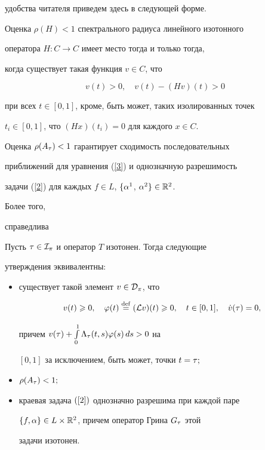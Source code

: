 удобства читателя приведем здесь в следующей форме.





\begin{lem}


\label{lem1}


Оценка $\rho(H)<1$ спектрального радиуса линейного изотонного


оператора $H: C \to C$ имеет место тогда и только тогда,


когда существует такая функция $v\in C$, что


$$


v(t)>0,\quad v(t)-(Hv)(t)>0


$$


при всех $t\in[0,1]$, кроме, быть может, таких изолированных точек


$t_i\in[0,1]$, что $(Hx)(t_i)=0$ для каждого $x\in C$.


\end{lem}





Оценка $\rho(A_\tau)<1$ гарантирует сходимость последовательных


приближений для уравнения (\ref{3}) и однозначную разрешимость


задачи (\ref{2}) для каждых $f\in L$, $\{\alpha^1$, $\alpha^2\}\in{\Bbb R}^2$.


Более того,


справедлива





\begin{lem}


\label{lem2}


Пусть $\tau\in{\cal I}_\pi$ и оператор $T$ изотонен. Тогда следующие


утверждения экви\-ва\-лент\-ны$:$


\begin{itemize}


\item[а)] существует такой элемент $v\in{\cal D}_\pi$, что


$$


v(t)\ge0,\quad \phi(t)\df(\L v)(t)\ge0,\quad


t\in[0,1],\quad \Dot v(\t)=0,


$$


причем $v(\tau)+\int\limits_0^1\Lambda_\tau(t,s)\varphi(s)\,ds>0$ на


$[0,1]$ за исключением, быть может, точки $t=\tau;$


\item[б)] $\rho(A_\tau)<1;$


\item[в)] краевая задача $(\ref{2})$ однозначно разрешима при каждой паре


$\{f,\alpha\}\in L\times{\Bbb R}^2$, причем оператор Грина $G_\tau$ этой


задачи изотонен.


\end{itemize}


\end{lem}





